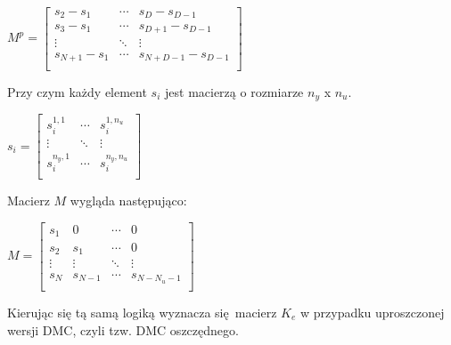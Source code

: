 \medskip

\begin{math}
    M^p = \begin{bmatrix}
        s_2 - s_1 & \cdots & s_D - s_{D - 1} \\
        s_3 - s_1 & \cdots & s_{D + 1} - s_{D - 1} \\
        \vdots & \ddots &\vdots \\
        s_{N + 1} - s_1 & \cdots & s_{N + D - 1} - s_{D - 1} \\
    \end{bmatrix}
\end{math}

\medskip

Przy czym każdy element $s_i$ jest macierzą o rozmiarze $n_y$ x $n_u$.

\medskip

\begin{math}
    s_i = \begin{bmatrix}
        s_i^{1,1} & \cdots & s_i^{1,n_u} \\
        \vdots & \ddots & \vdots \\
        s_i^{n_y,1} & \cdots & s_i^{n_y,n_u} \\
    \end{bmatrix}
\end{math}

\medskip

Macierz $M$ wygląda następująco:

\medskip

\begin{math}
    M = \begin{bmatrix}
        s_1 & 0 & \cdots & 0 \\
        s_2 & s_1 & \cdots & 0 \\
        \vdots & \vdots & \ddots & \vdots \\
        s_N & s_{N - 1} & \cdots & s_{N - N_u - 1} \\
    \end{bmatrix}
\end{math}

\medskip

Kierując się tą samą logiką wyznacza się macierz $K_e$ w przypadku uproszczonej wersji DMC, czyli tzw. DMC oszczędnego.
